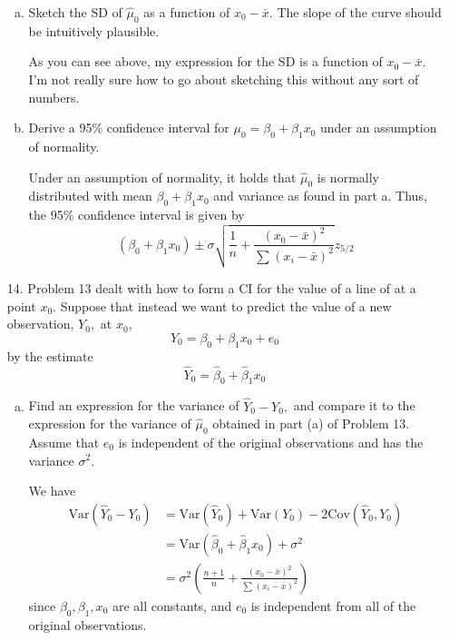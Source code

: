 \documentclass{article}
\newcommand{\var}{\mathrm{Var}}
\newcommand{\cov}{\mathrm{Cov}}
\begin{document}
\begin{itemize}
\begin{enumerate}[a.]
			\item Sketch the SD of $\hat\mu_0$ as a function of $x_0-\bar x.$ The slope of the curve should be intuitively plausible.
				\begin{answer*}
					As you can see above, my expression for the SD is a function of $x_0-\bar x.$ I'm not really sure how to go about sketching this without any sort of numbers.
				\end{answer*}

			\item Derive a 95\% confidence interval for $\mu_0=\beta_0+\beta_1x_0$ under an assumption of normality.
				\begin{soln}
					Under an assumption of normality, it holds that $\hat\mu_0$ is normally distributed with mean $\beta_0+\beta_1 x_0$ and variance as found in part a. Thus, the 95\% confidence interval is given by
					\[(\beta_0+\beta_1x_0) \pm\sigma\sqrt{\frac{1}{n} + \frac{(x_0-\bar x)^2}{\sum_{}^{}(x_i-\bar x)^2}} z_{5/2}\]
				\end{soln}
				
		\end{enumerate}
			
	\item[14.] Problem 13 dealt with how to form a CI for the value of a line of at a point $x_0.$ Suppose that instead we want to predict the value of a new observation, $Y_0,$ at $x_0,$ \[Y_0=\beta_0+\beta_1x_0+e_0\] by the estimate \[\hat Y_0=\hat\beta_0+\hat\beta_1x_0\]
		\begin{enumerate}[a.]
			\item Find an expression for the variance of $\hat Y_0-Y_0,$ and compare it to the expression for the variance of $\hat\mu_0$ obtained in part (a) of Problem 13. Assume that $e_0$ is independent of the original observations and has the variance $\sigma^2.$
				\begin{soln}
					We have
					\begin{align*}
						\var(\hat Y_0-Y_0) &= \var(\hat Y_0) +\var(Y_0) - 2\cov(\hat Y_0, Y_0) \\
						&=\var(\hat\beta_0+\hat\beta_1 x_0) + \sigma^2 \\
						&= \sigma^2 \left( \frac{n+1}{n} + \frac{(x_0-\bar x)^2}{\sum_{}^{}(x_i-\bar x)^2}\right)
					\end{align*}
					since $\beta_0, \beta_1, x_0$ are all constants, and $e_0$ is independent from all of the original observations.
				\end{soln}


\end{enumerate}
\end{itemize}
\end{document}
